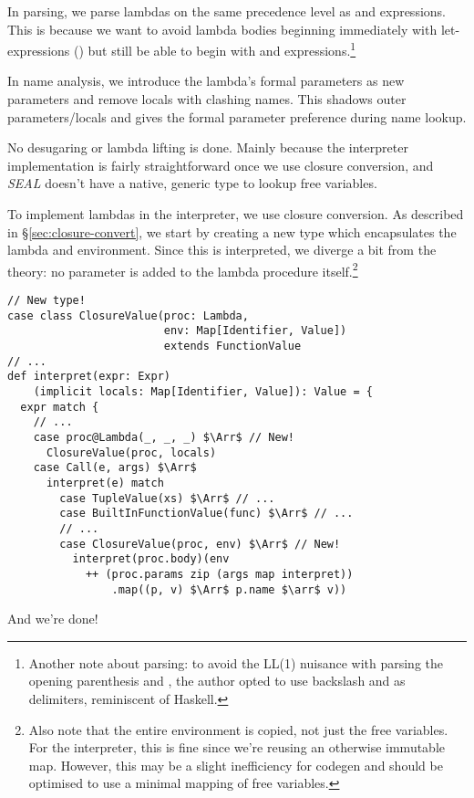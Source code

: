 In parsing, we parse lambdas on the same precedence level as  and  expressions. This is because we want to avoid lambda bodies beginning immediately with let-expressions () but still be able to begin with  and  expressions.\footnote{Another note about parsing: to avoid the LL(1) nuisance with parsing the opening parenthesis and \code{$\Arr$}, the author opted to use backslash and \code{$\arr$} as delimiters, reminiscent of Haskell.}

In name analysis, we introduce the lambda's formal parameters as new parameters and remove locals with clashing names. This shadows outer parameters/locals and gives the formal parameter preference during name lookup.

No desugaring or lambda lifting is done. Mainly because the interpreter implementation is fairly straightforward once we use closure conversion, and \textit{SEAL} doesn't have a native, generic  type to lookup free variables.\footnotemark


To implement lambdas in the interpreter, we use closure conversion. As described in §\ref{sec:closure-convert}, we start by creating a new  type which encapsulates the lambda and environment. Since this is interpreted, we diverge a bit from the theory: no  parameter is added to the lambda procedure itself.\footnote{Also note that the entire environment is copied, not just the free variables. For the interpreter, this is fine since we're reusing an otherwise immutable map. However, this may be a slight inefficiency for codegen and should be optimised to use a minimal mapping of free variables.}
\begin{lstlisting}
// New type!
case class ClosureValue(proc: Lambda,
                        env: Map[Identifier, Value])
                        extends FunctionValue
// ...
def interpret(expr: Expr)
    (implicit locals: Map[Identifier, Value]): Value = {
  expr match {
    // ...
    case proc@Lambda(_, _, _) $\Arr$ // New!
      ClosureValue(proc, locals)
    case Call(e, args) $\Arr$
      interpret(e) match
        case TupleValue(xs) $\Arr$ // ...
        case BuiltInFunctionValue(func) $\Arr$ // ...
        // ...
        case ClosureValue(proc, env) $\Arr$ // New!
          interpret(proc.body)(env
            ++ (proc.params zip (args map interpret))
                .map((p, v) $\Arr$ p.name $\arr$ v))
\end{lstlisting}
And we're done!